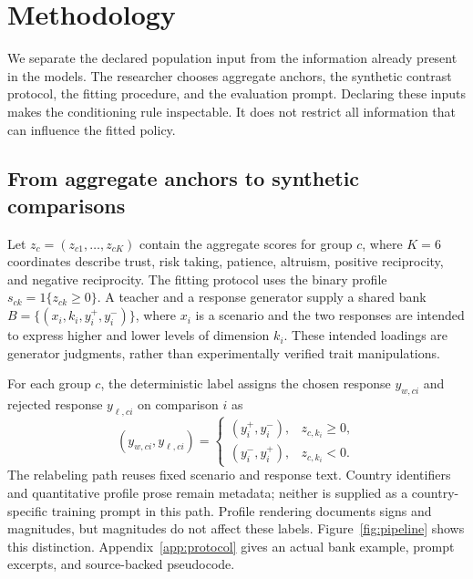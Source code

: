 \section{Methodology}\label{sec:methodology}
We separate the declared population input from the information already present in the models. The researcher chooses aggregate anchors, the synthetic contrast protocol, the fitting procedure, and the evaluation prompt. Declaring these inputs makes the conditioning rule inspectable. It does not restrict all information that can influence the fitted policy.

\subsection{From aggregate anchors to synthetic comparisons}
Let $z_c=(z_{c1},\ldots,z_{cK})$ contain the aggregate scores for group $c$, where $K=6$ coordinates describe trust, risk taking, patience, altruism, positive reciprocity, and negative reciprocity. The fitting protocol uses the binary profile $s_{ck}=1\{z_{ck}\geq0\}$. A teacher and a response generator supply a shared bank $B=\{(x_i,k_i,y_i^+,y_i^-)\}$, where $x_i$ is a scenario and the two responses are intended to express higher and lower levels of dimension $k_i$. These intended loadings are generator judgments, rather than experimentally verified trait manipulations.

For each group $c$, the deterministic label assigns the chosen response $y_{w,ci}$ and rejected response $y_{\ell,ci}$ on comparison $i$ as
\begin{equation}
(y_{w,ci},y_{\ell,ci})=\begin{cases}(y_i^+,y_i^-),&z_{c,k_i}\geq0,\\(y_i^-,y_i^+),&z_{c,k_i}<0.\end{cases}
\label{eq:sign_rule}
\end{equation}
The relabeling path reuses fixed scenario and response text. Country identifiers and quantitative profile prose remain metadata; neither is supplied as a country-specific training prompt in this path. Profile rendering documents signs and magnitudes, but magnitudes do not affect these labels. Figure~\ref{fig:pipeline} shows this distinction. Appendix~\ref{app:protocol} gives an actual bank example, prompt excerpts, and source-backed pseudocode.


